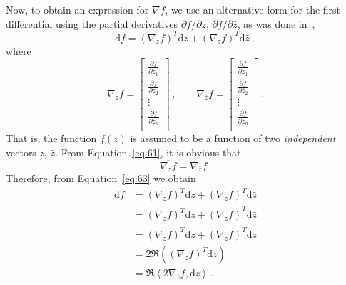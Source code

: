 Now, to obtain an expression for $\nabla f$, we use an
alternative form for the first differential using the partial derivatives
$\partial f/\partial z$, $\partial f/\partial \bar z$, as was done
in~,
\begin{equation}
  \label{eq:63}
  \mathrm{d}f =
  \left(
    \nabla_{z}f
  \right) ^{T}\mathrm{d} z +
  \left(
    \nabla_{\bar z}f
  \right) ^{T}\mathrm{d} \bar z \,,
\end{equation}
where
\begin{equation}
  \label{eq:60}
  \nabla_{z}f =
  \begin{bmatrix}
    \frac{\partial f}{\partial z_{1}}\\
    \frac{\partial f}{\partial z_{2}}\\
    \vdots\\
    \frac{\partial f}{\partial z_{n}}\\
  \end{bmatrix} \,, 
  \qquad
  \nabla_{\bar{z}}f =
  \begin{bmatrix}
    \frac{\partial f}{\partial \bar{z}_{1}}\\
    \frac{\partial f}{\partial \bar{z}_{2}}\\
    \vdots\\
    \frac{\partial f}{\partial \bar{z}_{n}}\\
  \end{bmatrix} \,. 
\end{equation}
That is, the function $f(z)$ is assumed to be a function of two
\textit{independent} vectors $z$, $\bar z$. From
Equation~\eqref{eq:61}, it is obvious that
\begin{equation}
  \label{eq:64}
  \overline{\nabla_{z}f} =  \nabla_{\bar{z}}f \,. 
\end{equation}
Therefore, from Equation~\eqref{eq:63} we obtain
\begin{equation}
  \label{eq:65}
  \begin{split}
    \mathrm{d}f
    & =
    \left(
      \nabla_{z}f
    \right) ^{T}\mathrm{d} z +
    \left(
      \nabla_{\bar z}f
    \right) ^{T}\mathrm{d} \bar z\\
    & =  \left(
      \nabla_{z}f
    \right) ^{T}\mathrm{d} z +
    \overline{\left(
        \nabla_{z}f
      \right)} ^{T}\mathrm{d} \bar z\\
    & = \left(
      \nabla_{z}f
    \right) ^{T}\mathrm{d} z +
    \overline{\left(
        \nabla_{ z}f
      \right) ^{T}\mathrm{d}  z}\\
    & = 2 \Re \left( \left(
      \nabla_{z}f
    \right) ^{T}\mathrm{d} z \right) \\
    & = \Re \left\langle
    2\nabla_{\bar z}f, \mathrm{d} z \right\rangle \,.
  \end{split}
\end{equation}
